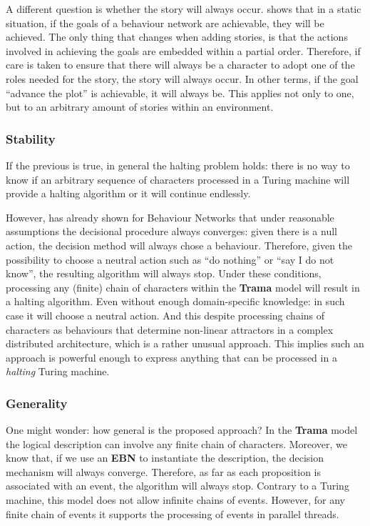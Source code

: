 \documentclass[
		twoside,openright,titlepage,numbers=noenddot,manychapters,
		headinclude,%
                footinclude=false,cleardoublepage=empty,
                BCOR=5mm,
		fontsize=11pt, %
                 enabledeprecatedfontcommands]{scrreprt}
\begin{document}
A different question is whether the story will always occur. \cite{nebel2004behaviour} shows that in a static situation, if the goals of a behaviour network are achievable, they will be achieved. The only thing that changes when adding stories, is that the actions involved in achieving the goals are embedded within a partial order. Therefore, if care is taken to ensure that there will always be a character to adopt one of the roles needed for the story, the story will always occur. In other terms, if the goal ``advance the plot'' is achievable, it will always be. This applies not only to one, but to an arbitrary amount of stories within an environment. 



\subsubsection{Stability}
 If the previous is true,  in general the halting problem holds: there is no way to know if an arbitrary sequence of characters processed in a Turing machine will provide a halting algorithm or it will continue endlessly.

However, \cite{dorer1999bnc} has already shown for Behaviour Networks  that under reasonable assumptions the decisional procedure always converges: given there is a null action, the decision method will always chose a behaviour. Therefore, given the possibility to choose a neutral action such as ``do nothing'' or ``say I do not know'', the resulting algorithm will always stop. Under these conditions, processing any (finite) chain of characters  within the \textbf{Trama} model will result in a halting algorithm. Even without enough domain-specific knowledge: in such case it will choose a neutral action. 
And this despite processing chains of characters as behaviours that determine non-linear attractors in a complex distributed architecture, which is a rather unusual approach. 
This implies such an approach is powerful enough to express anything that can be processed in a \emph{halting} Turing machine. 

\subsubsection{Generality}
One might wonder: how general is the proposed approach? In the \textbf{Trama} model the logical description can involve any finite chain of characters. Moreover, we know that, if we use an \textbf{EBN} to instantiate the description, the decision mechanism will always converge. Therefore, as far as each proposition is associated with an event, the algorithm will always stop. Contrary to a Turing machine, this model does not allow infinite chains of events. However, for any finite chain of events it supports the processing of events in parallel threads.
\end{document}
